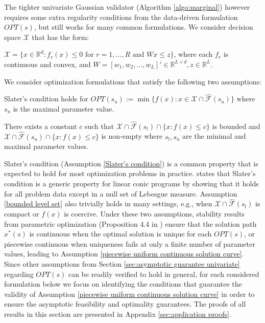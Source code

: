 \documentclass[mnsc,blindrev]{informs4} %
\newcommand{\R}{\mathbb{R}}
\begin{document}
The tighter univariate Gaussian validator (Algorithm \ref{algo:marginal}) however requires some extra regularity conditions from the data-driven formulation $OPT(s)$, but still works for many common formulations. We consider decision space $\mathcal X$ that has the form:
\begin{assumption}\label{convex decision space}
$\mathcal X=\{x\in \R^d:f_r(x)\leq 0\text{ for }r=1,\ldots,R\text{ and }Wx\leq z\}$, where each $f_r$ is continuous and convex, and $W=[w_1,w_2,\ldots,w_L]'\in \R^{L\times d},z\in\R^L$.
\end{assumption}
We consider optimization formulations that satisfy the following two assumptions:
\begin{assumption}\label{Slater's condition}
Slater's condition holds for $OPT(s_u):=\min\{f(x):x\in\mathcal X\cap\hat{\mathcal F}(s_u) \}$ where $s_u$ is the maximal parameter value.
\end{assumption}
\begin{assumption}\label{bounded level set}
There exists a constant $c$ such that $\mathcal X\cap \hat{\mathcal F}(s_l)\cap \{x:f(x)\leq c\}$ is bounded and $\mathcal X\cap \hat{\mathcal F}(s_u)\cap \{x:f(x)\leq c\}$ is non-empty where $s_l,s_u$ are the minimal and maximal parameter values.
\end{assumption}
Slater's condition (Assumption \ref{Slater's condition}) is a common property that is expected to hold for most optimization problems in practice. \cite{dur2016genericity} states that Slater's condition is a generic property for linear conic programs by showing that it holds for all problem data except in a null set of Lebesgue measure. Assumption \ref{bounded level set} also trivially holds in many settings, e.g., when $\mathcal X\cap\hat{\mathcal F}(s_l)$ is compact or $f(x)$ is coercive. Under these two assumptions, stability results from parametric optimization (Proposition 4.4 in \cite{bonnans2013perturbation}) ensure that the solution path $x^*(s)$ is continuous when the optimal solution is unique for each $OPT(s)$, or piecewise continuous when uniqueness fails at only a finite number of parameter values, leading to Assumption \ref{piecewise uniform continuous solution curve}. Since other assumptions from Section \ref{sec:asymptotic guarantee univariate} regarding $OPT(s)$ can be readily verified to hold in general, for each considered formulation below we focus on identifying the conditions that guarantee the validity of Assumption \ref{piecewise uniform continuous solution curve} in order to ensure the asymptotic feasibility and optimality guarantees. The proofs of all results in this section are presented in Appendix \ref{sec:application proofs}.
\end{document}
